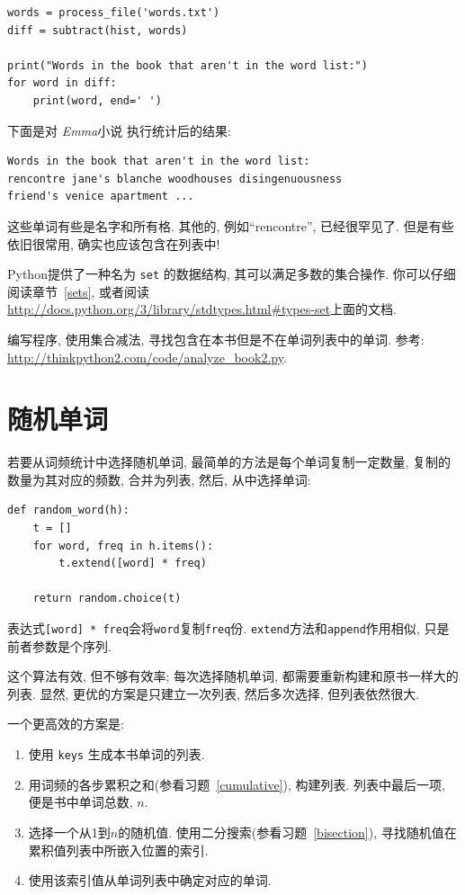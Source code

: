 \documentclass[10pt]{book}
\begin{document}
\begin{verbatim}
words = process_file('words.txt')
diff = subtract(hist, words)

print("Words in the book that aren't in the word list:")
for word in diff:
    print(word, end=' ')
\end{verbatim}
%
下面是对 {\em Emma}小说 执行统计后的结果:

\begin{verbatim}
Words in the book that aren't in the word list:
rencontre jane's blanche woodhouses disingenuousness 
friend's venice apartment ...
\end{verbatim}
%
这些单词有些是名字和所有格. 其他的, 例如``rencontre'', 已经很罕见了. 
但是有些依旧很常用, 确实也应该包含在列表中!

\begin{exercise}

Python提供了一种名为 {\tt set} 的数据结构, 其可以满足多数的集合操作. 
你可以仔细阅读章节~\ref{sets}, 或者阅读
\url{http://docs.python.org/3/library/stdtypes.html#types-set}上面的文档. 

编写程序, 使用集合减法, 寻找包含在本书但是不在单词列表中的单词. 
参考:
\url{http://thinkpython2.com/code/analyze_book2.py}.

\end{exercise}


\section{随机单词}
\label{randomwords}

若要从词频统计中选择随机单词, 最简单的方法是每个单词复制一定数量, 
复制的数量为其对应的频数, 合并为列表, 然后, 从中选择单词:

\begin{verbatim}
def random_word(h):
    t = []
    for word, freq in h.items():
        t.extend([word] * freq)

    return random.choice(t)
\end{verbatim}
%
表达式{\tt [word] * freq}会将{\tt word}复制{\tt freq}份. 
{\tt extend}方法和{\tt append}作用相似, 只是前者参数是个序列. 

这个算法有效, 但不够有效率; 每次选择随机单词, 
都需要重新构建和原书一样大的列表. 
显然, 更优的方案是只建立一次列表, 然后多次选择, 但列表依然很大.

一个更高效的方案是:

\begin{enumerate}

\item 使用 {\tt keys} 生成本书单词的列表.

\item 用词频的各步累积之和(参看习题~\ref{cumulative}), 构建列表. 
列表中最后一项, 便是书中单词总数, $n$. 
  
\item 选择一个从1到$n$的随机值. 使用二分搜索(参看习题~\ref{bisection}), 
寻找随机值在累积值列表中所嵌入位置的索引. 

\item 使用该索引值从单词列表中确定对应的单词. 

\end{enumerate}
\end{document}
